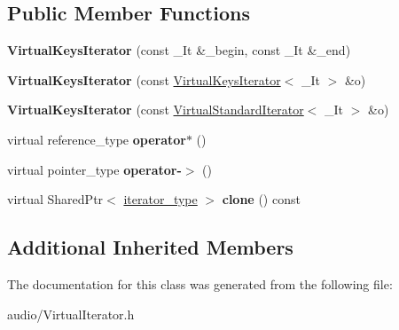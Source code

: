 \subsection*{Public Member Functions}
\begin{DoxyCompactItemize}
\item 
{\bfseries Virtual\+Keys\+Iterator} (const \+\_\+\+It \&\+\_\+begin, const \+\_\+\+It \&\+\_\+end)\hypertarget{classAudio_1_1VirtualKeysIterator_a9abcbb460d50fd9a7bde86fa3f20912b}{}\label{classAudio_1_1VirtualKeysIterator_a9abcbb460d50fd9a7bde86fa3f20912b}

\item 
{\bfseries Virtual\+Keys\+Iterator} (const \hyperlink{classAudio_1_1VirtualKeysIterator}{Virtual\+Keys\+Iterator}$<$ \+\_\+\+It $>$ \&o)\hypertarget{classAudio_1_1VirtualKeysIterator_a2d1dc29ac569a5b2b5c648e5a640c96a}{}\label{classAudio_1_1VirtualKeysIterator_a2d1dc29ac569a5b2b5c648e5a640c96a}

\item 
{\bfseries Virtual\+Keys\+Iterator} (const \hyperlink{classAudio_1_1VirtualStandardIterator}{Virtual\+Standard\+Iterator}$<$ \+\_\+\+It $>$ \&o)\hypertarget{classAudio_1_1VirtualKeysIterator_abe771893a033f1306fd6cd81866a8185}{}\label{classAudio_1_1VirtualKeysIterator_abe771893a033f1306fd6cd81866a8185}

\item 
virtual reference\+\_\+type {\bfseries operator$\ast$} ()\hypertarget{classAudio_1_1VirtualKeysIterator_a8e52d6f7013660074945de10fc43200e}{}\label{classAudio_1_1VirtualKeysIterator_a8e52d6f7013660074945de10fc43200e}

\item 
virtual pointer\+\_\+type {\bfseries operator-\/$>$} ()\hypertarget{classAudio_1_1VirtualKeysIterator_a8c30bd275f1be89040e9bc9d5c7de2fb}{}\label{classAudio_1_1VirtualKeysIterator_a8c30bd275f1be89040e9bc9d5c7de2fb}

\item 
virtual Shared\+Ptr$<$ \hyperlink{classAudio_1_1VirtualIterator}{iterator\+\_\+type} $>$ {\bfseries clone} () const \hypertarget{classAudio_1_1VirtualKeysIterator_ab8bda1c2be47065b04dcf7acc42afc00}{}\label{classAudio_1_1VirtualKeysIterator_ab8bda1c2be47065b04dcf7acc42afc00}

\end{DoxyCompactItemize}
\subsection*{Additional Inherited Members}


The documentation for this class was generated from the following file\+:\begin{DoxyCompactItemize}
\item 
audio/Virtual\+Iterator.\+h\end{DoxyCompactItemize}
